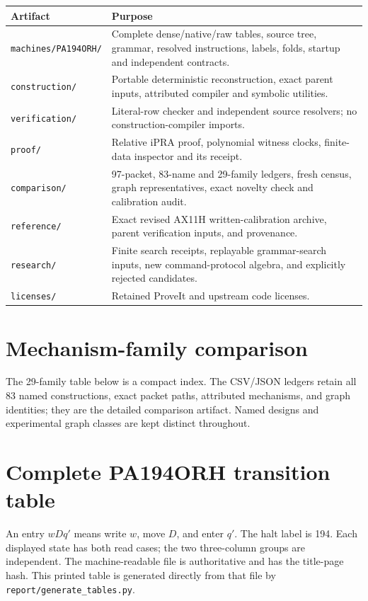 \documentclass[11pt,a4paper]{article}
\theoremstyle{definition}
\newcommand{\ipra}{\mathrm{iPRA}}
\newcommand{\file}[1]{\nolinkurl{#1}}
\begin{document}
\begin{longtable}{p{}p{}}
\toprule
Artifact & Purpose\\
\midrule\endhead
\file{machines/PA194ORH/} & Complete dense/native/raw tables, source
tree, grammar, resolved instructions, labels, folds, startup and
independent contracts.\\
\file{construction/} & Portable deterministic reconstruction, exact
parent inputs, attributed compiler and symbolic utilities.\\
\file{verification/} & Literal-row checker and independent source
resolvers; no construction-compiler imports.\\
\file{proof/} & Relative $\ipra$ proof, polynomial witness clocks,
finite-data inspector and its receipt.\\
\file{comparison/} & 97-packet, 83-name and 29-family ledgers, fresh
census, graph representatives, exact novelty check and calibration audit.\\
\file{reference/} & Exact revised AX11H written-calibration archive,
parent verification inputs, and provenance.\\
\file{research/} & Finite search receipts, replayable grammar-search
inputs, new command-protocol algebra, and explicitly rejected candidates.\\
\file{licenses/} & Retained ProveIt and upstream code licenses.\\
\bottomrule
\end{longtable}

\clearpage
\appendix
\section{Mechanism-family comparison}
The 29-family table below is a compact index. The CSV/JSON ledgers
retain all 83 named constructions, exact packet paths, attributed
mechanisms, and graph identities; they are the detailed comparison
artifact. Named designs and experimental graph classes are kept
distinct throughout.


\clearpage
\section{Complete PA194ORH transition table}
\label{app:table}
An entry $wDq'$ means write $w$, move $D$, and enter $q'$.
The halt label is 194. Each displayed state has both read cases; the
two three-column groups are independent. The machine-readable file is
authoritative and has the title-page hash. This printed table is
generated directly from that file by \file{report/generate_tables.py}.

\end{document}
